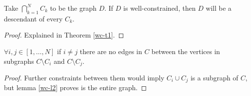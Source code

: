 \documentclass[11pt]{article}
\begin{document}
\begin{corollary}
Take $\bigcap_{k=1}^N{C_k}$ to be the graph $D$. If $D$ is well-constrained, then $D$ will be a descendant of every $C_k$.
\end{corollary}

\begin{proof}
Explained in Theorem \ref{wc-t1}.
\end{proof}

\begin{corollary}
$\forall i,j\in [1,\ldots,N]$ if $i\neq j$ there are no edges in $C$ between the vertices in subgraphs $C\setminus C_i$ and $C\setminus C_j$.
\end{corollary}

\begin{proof}
Further constraints between them would imply $C_i \cup C_j$ is a subgraph of $C$, but lemma \ref{wc-l2} proves is the entire graph.
\end{proof}










\end{document}
